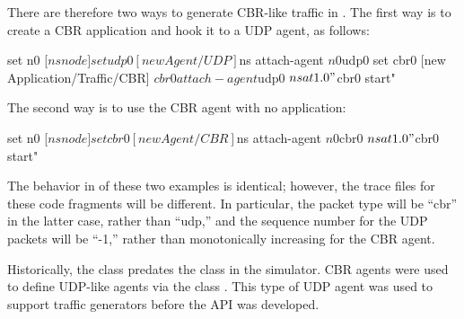 There are therefore two ways to generate CBR-like traffic in \ns.  The first
way is to create a CBR application and hook it to a UDP agent, as follows:
\begin{program}
        set n0 [$ns node]
        set udp0 [new Agent/UDP]
        $ns attach-agent $n0 $udp0
        set cbr0 [new Application/Traffic/CBR]
        $cbr0 attach-agent $udp0
        $ns at 1.0 "$cbr0 start"
\end{program}
The second way is to use the CBR agent with no application:
\begin{program}
        set n0 [$ns node]
        set cbr0 [new Agent/CBR]
        $ns attach-agent $n0 $cbr0
        $ns at 1.0 "$cbr0 start"
\end{program}
The behavior in \ns of these two examples is identical; however, the trace
files for these code fragments will be different.  In particular, the 
packet type will be ``cbr'' in the latter case, rather than ``udp,'' and
the sequence number for the UDP packets will be ``-1,'' rather than 
monotonically increasing for the CBR agent.

Historically, the class  predates the class 
in the simulator.  CBR agents were used to define UDP-like agents via the
class .  This type of UDP agent was used to support 
traffic generators before the \ns API was developed.
\endinput
